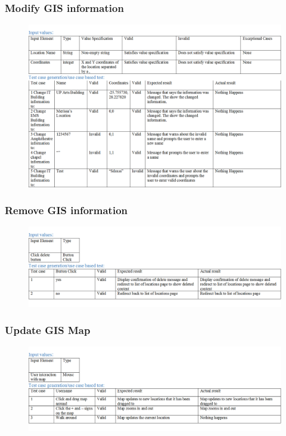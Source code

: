 \documentclass[english]{article}
\begin{document}
\subsubsection{Modify GIS information}
\begin{figure}[H]
\label{tab:example}
\hspace*{-2.5cm}
\includegraphics[width=180mm]{ModifyGISInformation.png}
\end{figure}
\subsubsection{Remove GIS information}
\begin{figure}[ht!]
\hspace*{-2.5cm}
\includegraphics[width=180mm]{DeleteGISInformation.png}
\end{figure}
\subsubsection{Update GIS Map}
\begin{figure}[H]
\hspace*{-2.5cm}
\includegraphics[width=180mm]{UpdateGISMap.png}
\end{figure}
\end{document}
